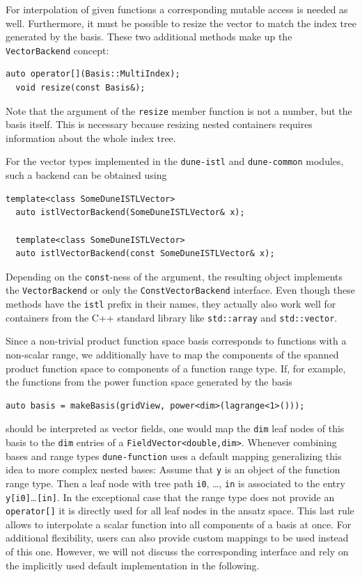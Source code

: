 \documentclass[a4paper,10pt,headings=normal,bibliography=totoc]{scrartcl}
\newcommand{\cpp}[1]{\lstinline[basicstyle=\ttfamily]!#1!}
\newcommand{\dunemodule}[1]{\texttt{#1}}
\begin{document}
For interpolation of given functions a corresponding mutable access is needed as well.
Furthermore, it must be possible to resize the vector to match
the index tree generated by the basis. These two additional methods make up the
\cpp{VectorBackend} concept:
\begin{lstlisting}[style=Interface]
  auto operator[](Basis::MultiIndex);
  void resize(const Basis&);
\end{lstlisting}
%
Note that the argument of the \cpp{resize}
member function is not a number, but the basis itself. This
is necessary because resizing nested containers requires information about the whole
index tree.

For the vector types implemented in the \dunemodule{dune-istl} and \dunemodule{dune-common}
modules, such a backend can be obtained using
\begin{lstlisting}[style=Interface]
  template<class SomeDuneISTLVector>
  auto istlVectorBackend(SomeDuneISTLVector& x);

  template<class SomeDuneISTLVector>
  auto istlVectorBackend(const SomeDuneISTLVector& x);
\end{lstlisting}
Depending on the \cpp{const}-ness of the argument, the resulting
object implements the \cpp{VectorBackend} or only the
\cpp{ConstVectorBackend} interface.  Even though these methods have the \cpp{istl} prefix
in their names, they actually also work well for containers from the C++ standard library
like \cpp{std::array} and \cpp{std::vector}.

Since a non-trivial product function space basis corresponds to functions with
a non-scalar range, we additionally have to map the components
of the spanned product function space to components of a function range type.
If, for example, the functions from the power function space generated by the basis
\begin{lstlisting}[style=Example]
auto basis = makeBasis(gridView, power<dim>(lagrange<1>()));
\end{lstlisting}
should be interpreted as vector fields, one would map the \cpp{dim}
leaf nodes of this basis to the \cpp{dim} entries of a \cpp{FieldVector<double,dim>}.
Whenever combining bases and range types \dunemodule{dune-function}
uses a default mapping generalizing this idea to more complex nested bases:
Assume that \cpp{y} is an object of the function range type.
Then a leaf node with tree path \cpp{i0}, \dots, \cpp{in} is associated
to the entry \cpp{y[i0]}\dots\cpp{[in]}.
In the exceptional case that the range type does not provide an \cpp{operator[]}
it is directly used for all leaf nodes in the ansatz space. This last rule allows
to interpolate a scalar function into all components of a basis at once.
For additional flexibility, users can also provide custom mappings to be used instead of this one.
However, we will not discuss the corresponding interface and rely
on the implicitly used default implementation in the following.
\end{document}
